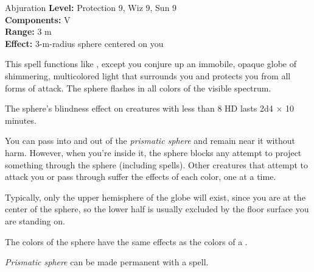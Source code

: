 {Abjuration}
{
	\textbf{Level:}
	Protection 9, Wiz 9, Sun 9\\
	\textbf{Components:}
	V\\
	\textbf{Range:}
	3 m\\
	\textbf{Effect:}
	3-m-radius sphere centered on you\\
}
{
	This spell functions like , except you conjure up an immobile, opaque globe of shimmering, multicolored light that surrounds you and protects you from all forms of attack. The sphere flashes in all colors of the visible spectrum.

	The sphere's blindness effect on creatures with less than 8 HD lasts 2d4 $\times$ 10 minutes.

	You can pass into and out of the \emph{prismatic sphere} and remain near it without harm. However, when you're inside it, the sphere blocks any attempt to project something through the sphere (including spells). Other creatures that attempt to attack you or pass through suffer the effects of each color, one at a time.

	Typically, only the upper hemisphere of the globe will exist, since you are at the center of the sphere, so the lower half is usually excluded by the floor surface you are standing on.

	The colors of the sphere have the same effects as the colors of a .

	\emph{Prismatic sphere} can be made permanent with a  spell.

}
